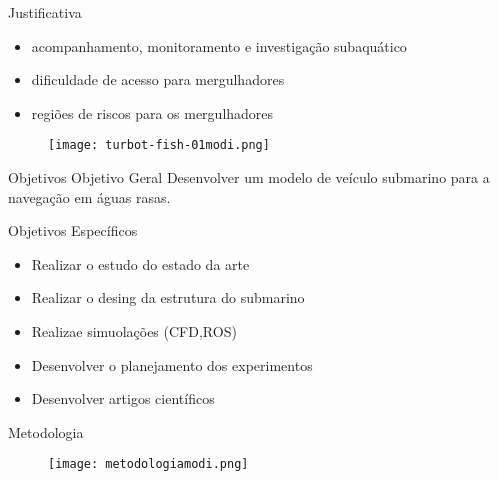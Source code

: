 \begin{frame}[c]{Justificativa}
    \begin{itemize}
        \item acompanhamento, monitoramento e investigação subaquático
        \item dificuldade de acesso para mergulhadores
        \item regiões de riscos para os mergulhadores
    \end{itemize}

    \begin{figure}
        \texttt{[image: turbot-fish-01modi.png]}
    \end{figure}
\end{frame}
\begin{frame}[t]{Objetivos}
    Objetivo Geral
    \newline
    Desenvolver um modelo de veículo submarino para a navegação em águas rasas.
    \newline

    Objetivos Específicos
    \begin{itemize}
        \item Realizar o estudo do estado da arte
        \item Realizar o desing da estrutura do submarino
        \item Realizae simuolações (CFD,ROS)
        \item Desenvolver o planejamento dos experimentos
        \item Desenvolver artigos científicos
    \end{itemize}
   

\end{frame}
\begin{frame}[c]{Metodologia }
        \begin{figure}
        \texttt{[image: metodologiamodi.png]}
    \end{figure}
\end{frame}
